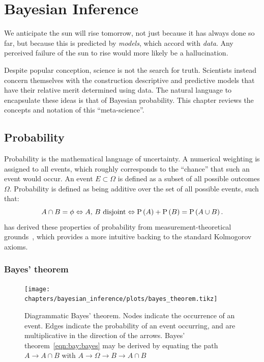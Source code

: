 \chapter{Bayesian Inference}
\label{chap:bay}

\epigraph{We anticipate the sun will rise tomorrow, not just because it has always done so far, but because this is predicted by {\em models}, which accord with {\em data}. Any perceived failure of the sun to rise would more likely be a hallucination.}{\davidmackay{}}

Despite popular conception, science is not the search for truth. Scientists instead concern themselves with the construction descriptive and predictive models that have their relative merit determined using data.
The natural language to encapsulate these ideas is that of Bayesian probability. This chapter reviews the concepts and notation of this ``meta-science''.

\section{Probability}
\label{sec:bay:prob}

Probability is the mathematical language of uncertainty. 
A numerical weighting is assigned to all events, which roughly corresponds to the ``chance'' that such an event would occur. An event $E\subset \Omega$ is defined as a subset of all possible outcomes $\Omega$. Probability is defined as being additive over the set of all possible events, such that:
\begin{equation}
  A\cap B = \phi \Leftrightarrow \text{$A$, $B$ disjoint} \Leftrightarrow \mathrm{P}\left(A\right) + \mathrm{P}\left(B\right) = \mathrm{P}\left(A\cup B\right).
\end{equation}
\johnskilling{} has derived these properties of probability from measurement-theoretical grounds~\citep[chap. 1]{Bayesian_methods_in_cosmology}, which provides a more intuitive backing to the standard Kolmogorov axioms.

\subsection{Bayes' theorem}

\begin{figure}[tp]
  \centering
  \texttt{[image: chapters/bayesian\_inference/plots/bayes\_theorem.tikz]}
  \caption{Diagrammatic Bayes' theorem. Nodes indicate the occurrence of an event. Edges indicate the probability of an event occurring, and are multiplicative in the direction of the arrows. Bayes' theorem~\protect\eqref{eqn:bay:bayes} may be derived by equating the path $A\to A\cap B$ with $A\to\Omega\to B\to A\cap B$}\label{fig:bay:bayes_theorem}
\end{figure}


